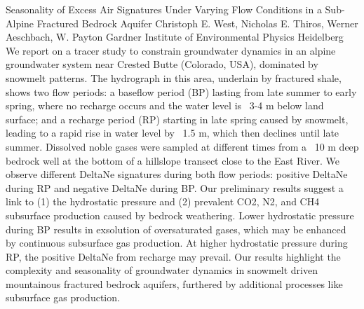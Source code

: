 \begin{conf-abstract}
{Seasonality of Excess Air Signatures Under Varying Flow Conditions in a Sub-Alpine Fractured Bedrock Aquifer}
{Christoph E. West, Nicholas E. Thiros, Werner Aeschbach, W. Payton Gardner}
{Institute of Environmental Physics Heidelberg}
{We report on a tracer study to constrain groundwater dynamics in an alpine groundwater system near Crested Butte (Colorado, USA), dominated by snowmelt patterns. The hydrograph in this area, underlain by fractured shale, shows two flow periods: a baseflow period (BP) lasting from late summer to early spring, where no recharge occurs and the water level is ~3-4 m below land surface; and a recharge period (RP) starting in late spring caused by snowmelt, leading to a rapid rise in water level by ~1.5 m, which then declines until late summer. 
Dissolved noble gases were sampled at different times from a ~10 m deep bedrock well at the bottom of a hillslope transect close to the East River. We observe different DeltaNe signatures during both flow periods: positive DeltaNe during RP and negative DeltaNe during BP. Our preliminary results suggest a link to (1) the hydrostatic pressure and (2) prevalent CO2, N2, and CH4 subsurface production caused by bedrock weathering. Lower hydrostatic pressure during BP results in exsolution of oversaturated gases, which may be enhanced by continuous subsurface gas production. At higher hydrostatic pressure during RP, the positive DeltaNe from recharge may prevail.
Our results highlight the complexity and seasonality of groundwater dynamics in snowmelt driven mountainous fractured bedrock aquifers, furthered by additional processes like subsurface gas production.
}
\end{conf-abstract}